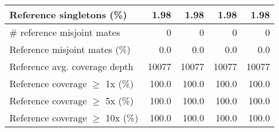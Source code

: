 \documentclass[12pt,a4paper]{article}
\begin{document}
\begin{table}[ht]
\begin{center}
\begin{tabular}{|l*{4}{|r}|}
Reference singletons (\%) & 1.98 & 1.98 & 1.98 & 1.98 \\ \hline
\# reference misjoint mates & 0 & 0 & 0 & 0 \\ \hline
Reference misjoint mates (\%) & 0.0 & 0.0 & 0.0 & 0.0 \\ \hline
Reference avg. coverage depth & 10077 & 10077 & 10077 & 10077 \\ \hline
Reference coverage $\geq$ 1x (\%) & 100.0 & 100.0 & 100.0 & 100.0 \\ \hline
Reference coverage $\geq$ 5x (\%) & 100.0 & 100.0 & 100.0 & 100.0 \\ \hline
Reference coverage $\geq$ 10x (\%) & 100.0 & 100.0 & 100.0 & 100.0 \\ \hline
\end{tabular}
\end{center}
\end{table}
\end{document}
